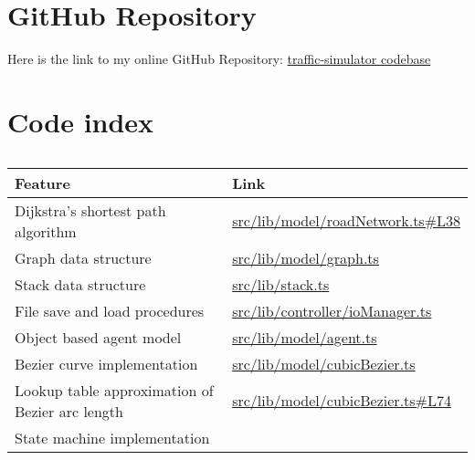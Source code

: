 \section{GitHub Repository}

    Here is the link to my online GitHub Repository: \href{https://github.com/joshua-smart/traffic-simulator}{traffic-simulator codebase}

    \section{Code index}

    \begin{table}
        \centering
        \begin{tabular}{|p{}|p{}|}
            \hline
            \textbf{Feature} & \textbf{Link}
            \\\hline
            Dijkstra's shortest path algorithm & \href{https://github.com/joshua-smart/traffic-simulator/blob/main/src/lib/model/roadNetwork.ts#L38}{src/lib/model/roadNetwork.ts\#L38}
            \\\hline
            Graph data structure & \href{https://github.com/joshua-smart/traffic-simulator/blob/main/src/lib/model/graph.ts}{src/lib/model/graph.ts}
            \\\hline
            Stack data structure & \href{https://github.com/joshua-smart/traffic-simulator/blob/main/src/lib/stack.ts}{src/lib/stack.ts}
            \\\hline
            File save and load procedures & \href{https://github.com/joshua-smart/traffic-simulator/blob/main/src/lib/controller/ioManager.ts}{src/lib/controller/ioManager.ts}
            \\\hline
            Object based agent model & \href{https://github.com/joshua-smart/traffic-simulator/blob/main/src/lib/model/agent.ts}{src/lib/model/agent.ts}
            \\\hline
            Bezier curve implementation & \href{https://github.com/joshua-smart/traffic-simulator/blob/main/src/lib/model/cubicBezier.ts}{src/lib/model/cubicBezier.ts}
            \\\hline
            Lookup table approximation of Bezier arc length & \href{https://github.com/joshua-smart/traffic-simulator/blob/main/src/lib/model/cubicBezier.ts#L74}{src/lib/model/cubicBezier.ts\#L74}
            \\\hline
            State machine implementation & \href{}
        \end{tabular}
        \caption{}
        \label{}
    \end{table}
